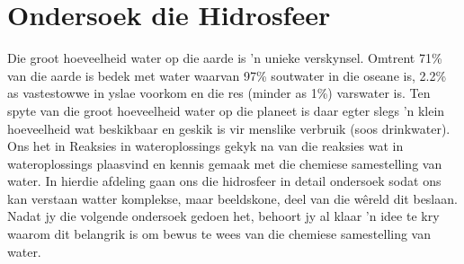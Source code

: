 \section{Ondersoek die Hidrosfeer}
            \nopagebreak

Die groot hoeveelheid water op die aarde is  'n unieke verskynsel. Omtrent 71\% van die aarde is bedek met water waarvan 97\% soutwater in die oseane is, 2.2\% as vastestowwe in yslae voorkom en die res (minder as 1\%) varswater is. Ten spyte van die groot hoeveelheid water op die planeet is daar egter slegs  'n klein hoeveelheid wat beskikbaar en geskik is vir menslike verbruik (soos drinkwater). 
Ons het in Reaksies in wateroplossings gekyk na van die reaksies wat in wateroplossings plaasvind en kennis gemaak met die chemiese samestelling van water. In hierdie afdeling gaan ons die hidrosfeer in detail ondersoek sodat ons kan verstaan watter komplekse, maar beeldskone, deel van die wêreld dit beslaan. Nadat jy die volgende ondersoek gedoen het, behoort jy al klaar  'n idee te kry waarom dit belangrik is om bewus te wees van die chemiese samestelling van water.
\label{m38138*secfhsst!!!underscore!!!id86}
